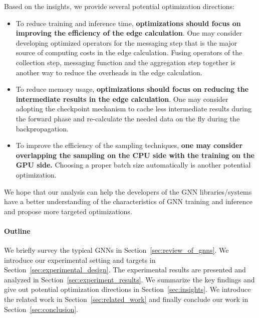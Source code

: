 Based on the insights, we provide several potential optimization directions:
\begin{itemize}
      \item To reduce training and inference time, \textbf{optimizations should focus on improving the efficiency of the edge calculation}. 
      One may consider developing optimized operators for the messaging step that is the major source of computing costs in the edge calculation.
       Fusing operators of the collection step, messaging function and the aggregation step together is another way to reduce the overheads in the edge calculation.
      \item To reduce memory usage, \textbf{optimizations should focus on reducing the intermediate results in the edge calculation}. 
      One may consider adopting the checkpoint mechanism to cache less intermediate results during the forward phase and re-calculate the needed data on the fly during the backpropagation.
      \item To improve the efficiency of the sampling techniques, \textbf{one may consider overlapping the sampling on the CPU side with the training on the GPU side.} 
      Choosing a proper batch size automatically is another potential optimization.
\end{itemize}
We hope that our analysis can help the developers of the GNN libraries/systems have a better understanding of the characteristics of GNN training and inference and propose more targeted optimizations.

\paragraph{Outline}
We briefly survey the typical GNNs in Section~\ref{sec:review_of_gnns}.
We introduce our experimental setting and targets in Section~\ref{sec:experimental_design}.
The experimental results are presented and analyzed in Section~\ref{sec:experiment_results}.
We summarize the key findings and give out potential optimization directions in Section~\ref{sec:insights}.
We introduce the related work in Section~\ref{sec:related_work} and finally conclude our work in Section~\ref{sec:conclusion}.
